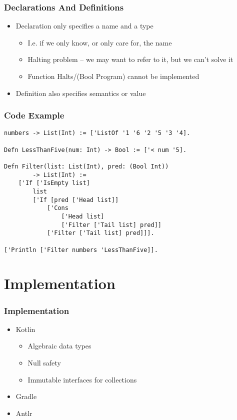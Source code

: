 \documentclass{beamer}
\begin{document}
\begin{frame}
    \frametitle{Declarations And Definitions}
    \begin{itemize}
        \item Declaration only specifies a name and a type
            \begin{itemize}
                \item I.e. if we only know, or only care for, the name
                \item Halting problem -- we may want to refer to it,
                    but we can't solve it
                \item Function Halts/(Bool Program) cannot be implemented
            \end{itemize}
        \item Definition also specifies semantics or value
    \end{itemize}
\end{frame}

\begin{frame}[fragile]
\frametitle{Code Example}
    
\begin{lstlisting}[basicstyle=\small]
numbers -> List(Int) := ['ListOf '1 '6 '2 '5 '3 '4].

Defn LessThanFive(num: Int) -> Bool := ['< num '5].

Defn Filter(list: List(Int), pred: (Bool Int))
        -> List(Int) :=
    ['If ['IsEmpty list]
        list
        ['If [pred ['Head list]]
            ['Cons 
                ['Head list] 
                ['Filter ['Tail list] pred]]
            ['Filter ['Tail list] pred]]].

['Println ['Filter numbers 'LessThanFive]].
\end{lstlisting}

\end{frame}

\section{Implementation}

\begin{frame}
    \frametitle{Implementation}
    \begin{itemize}
        \item Kotlin
            \begin{itemize}
                \item Algebraic data types
                \item Null safety
                \item Immutable interfaces for collections
            \end{itemize}
        \item Gradle
        \item Antlr
    \end{itemize}
\end{frame}
\end{document}
